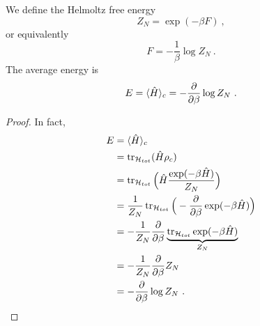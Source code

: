     We define the Helmoltz free energy
    \begin{equation*}
        Z_N = \exp(- \beta F) ~,
    \end{equation*}
    or equivalently 
    \begin{equation*}
        F = - \frac{1}{\beta} \log Z_N ~.
    \end{equation*}
    The average energy is 
    \begin{equation*}
        E = \langle\hat H\rangle_c = - \frac{\partial}{\partial\beta} \log Z_N ~.
    \end{equation*}
    \begin{proof}
        In fact, 
        \begin{equation*}
        \begin{aligned}
            E & = \langle\hat H\rangle_c \\ & = \operatorname{tr}_{\mathcal H_{tot}} (\hat H \rho_c) \\ & = \operatorname{tr}_{\mathcal H_{tot}} \Big ( \hat H \frac{\exp(- \beta \hat H)}{Z_N} \Big ) \\ & = \frac{1}{Z_N} \operatorname{tr}_{\mathcal H_{tot}} \Big (- \frac{\partial}{\partial\beta} \exp(- \beta \hat H) \Big) \\ & = - \frac{1}{Z_N} \frac{\partial}{\partial\beta} \underbrace{\operatorname{tr}_{\mathcal H_{tot}} \exp(- \beta \hat H)}_{Z_N} \\ & = - \frac{1}{Z_N} \frac{\partial}{\partial\beta} Z_N \\ & = - \frac{\partial}{\partial\beta} \log Z_N ~.
        \end{aligned}
        \end{equation*}
    \end{proof}

